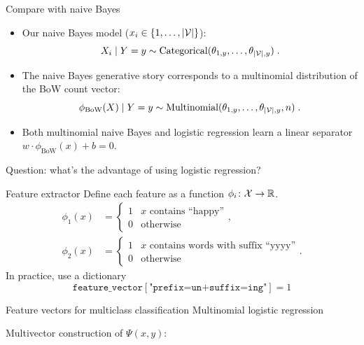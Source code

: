 \documentclass[usenames,dvipsnames,notes]{beamer}
\begin{document}
\begin{frame}
    {Compare with naive Bayes}
    \begin{itemize}
        \itemsep2em
        \item Our naive Bayes model ($x_i \in \left\{ 1, \ldots, |\mathcal{V}| \right\}$):
            $$
            X_i \mid Y=y \sim \text{Categorical}(\theta_{1,y}, \ldots, \theta_{|\mathcal{V}|, y}) \;.
            $$
        \item The naive Bayes generative story corresponds to a multinomial distribution of the BoW count vector:
            $$
            \phi_{\text{BoW}}(X) \mid Y=y \sim \text{Multinomial}(\theta_{1,y}, \ldots, \theta_{|\mathcal{V}|,y}, n) \;.
            $$
        \item Both multinomial naive Bayes and logistic regression learn a linear separator $w\cdot\phi_{\text{BoW}}(x)+b=0$.
    \end{itemize}
    Question: what's the advantage of using logistic regression?
\end{frame}

\begin{frame}
    {Feature extractor}
    Define each feature as a function $\phi_i\colon \mathcal{X} \rightarrow \mathbb{R}$.
    \begin{align*}
 \phi_1(x) &= \begin{cases}
 1 & \text{$x$ contains ``happy''} \\
 0 & \text{otherwise}
 \end{cases} ,
 \\
 \phi_2(x) &= \begin{cases}
 1 & \text{$x$ contains words with suffix ``yyyy''} \\
 0 & \text{otherwise}
 \end{cases} .
    \end{align*}
    In practice, use a dictionary
    $$
    \texttt{feature\_vector}[\texttt{"prefix=un+suffix=ing"}] = 1
    $$
\end{frame}

\begin{frame}
    {Feature vectors for multiclass classification}
    Multinomial logistic regression
    Multivector construction of $\Psi(x,y)$:
    \vspace{6em}
\end{frame}
\end{document}
